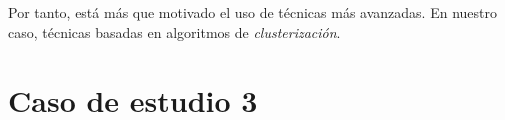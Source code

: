 \documentclass[11pt]{article}
\begin{document}
Por tanto, está más que motivado el uso de técnicas más avanzadas. En nuestro caso, técnicas basadas en algoritmos de \emph{clusterización}.




\pagebreak

\section{Caso de estudio 3}

\pagebreak



\end{document}
